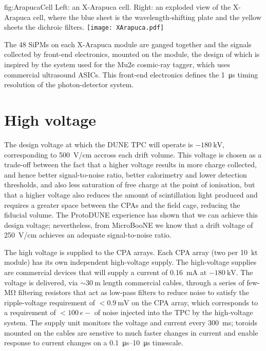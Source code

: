 \begin{dunefigure}{fig:ArapucaCell}
{Left: an X-Arapuca cell. Right: an exploded view of the X-Arapuca cell, where the blue sheet is the wavelength-shifting plate and the yellow sheets the dichroic filters.}
\texttt{[image: XArapuca.pdf]}
\end{dunefigure}

The 48 SiPMs on each X-Arapuca module are ganged together and the signals collected by front-end electronics, mounted on the module, the design of which is inspired by the system used for the Mu2e cosmic-ray tagger, which uses commercial ultrasound ASICs. This front-end electronics defines the \SI{1}{\micro\second} timing resolution of the photon-detector system.

\section{High voltage}
\label{sec:fdsp-exec-hv}

The design voltage at which the DUNE TPC will operate is $-\SI{180}{\kilo\volt}$, corresponding to \SI{500}{\volt/\cm} accross each drift volume. This voltage is chosen as a trade-off between the fact that a higher voltage results in more charge collected, and hence better signal-to-noise ratio, better calorimetry and lower detection thresholds, and also less saturation of free charge at the point of ionisation, but that a higher voltage also reduces the amount of scintillation light produced and requires a greater space between the CPAs and the field cage, reducing the fiducial volume. The ProtoDUNE experience has shown that we can achieve this design voltage; nevertheless, from MicroBooNE we know that a drift voltage of \SI{250}{\volt/\cm} achieves an adequate signal-to-noise ratio.

The high voltage is supplied to the CPA arrays. Each CPA array (two per \SI{10}{\kilo\tonne} module) has its own independent high-voltage supply. The high-voltage supplies are commercial devices that will supply a current of \SI{0.16}{\milli\ampere} at $-\SI{180}{\kilo\volt}$. The voltage is delivered, via $\sim\!\SI{30}{\meter}$ length commercial cables, through a series of few-\si{\mega\ohm} filtering resistors that act as low-pass filters to reduce noise to satisfy the ripple-voltage requirement of $<\!\SI{0.9}{\milli\volt}$ on the CPA array, which corresponds to a requirement of $<\!100\,e-$ of noise injected into the TPC by the high-voltage system. The supply unit monitors the voltage and current every \SI{300}{\milli\second}; toroids mounted on the cables are senstive to much faster changes in current and enable response to current changes on a \SIrange{0.1}{10}{\micro\second} timescale.

